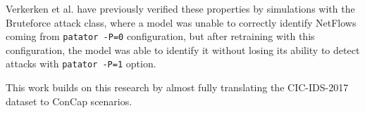 Verkerken et al. have previously verified these properties by simulations with the Bruteforce attack class, where a model was unable to correctly identify NetFlows coming from \texttt{patator -P=0} configuration, but after retraining with this configuration, the model was able to identify it without losing its ability to detect attacks with \texttt{patator -P=1} option.

This work builds on this research by almost fully translating the CIC-IDS-2017 dataset to ConCap scenarios.